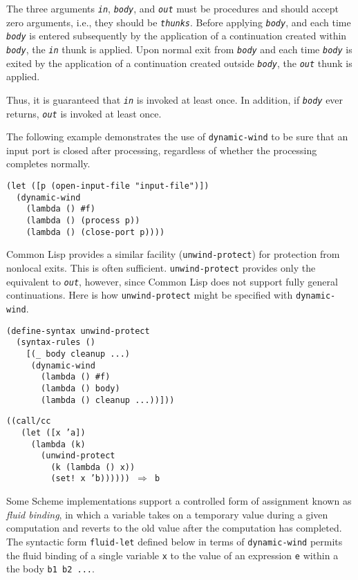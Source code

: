 The three arguments \texttt{\textit{in}}, \texttt{\textit{body}}, and \texttt{\textit{out}} must be procedures
and should accept zero arguments, i.e., they should be \label{control_s58}\texttt{\textit{thunks}}.
Before applying \texttt{\textit{body}}, and each time \texttt{\textit{body}} is entered subsequently
by the application of a continuation created within \texttt{\textit{body}}, the \texttt{\textit{in}}
thunk is applied.
Upon normal exit from \texttt{\textit{body}} and each time \texttt{\textit{body}} is exited by
the application of a continuation created outside \texttt{\textit{body}}, the \texttt{\textit{out}}
thunk is applied.


Thus, it is guaranteed that \texttt{\textit{in}} is invoked at least once.
In addition, if \texttt{\textit{body}} ever returns, \texttt{\textit{out}} is invoked at least
once.


The following example demonstrates the use of \texttt{dynamic-wind} to be sure
that an input port is closed after processing, regardless of whether the
processing completes normally.


\begin{alltt}
(let ([p (open-input-file "input-file")])
  (dynamic-wind
    (lambda () \#{}f)
    (lambda () (process p))
    (lambda () (close-port p))))
\end{alltt}


\label{control_s59}Common Lisp provides a similar
facility (\texttt{unwind-protect}) for protection from \label{control_s60}nonlocal exits.
This is often sufficient.
\texttt{unwind-protect} provides only the equivalent to \texttt{\textit{out}}, however,
since Common Lisp does not support fully general continuations.
Here is how \texttt{unwind-protect} might be specified with \texttt{dynamic-wind}.


\begin{alltt}
(define-syntax unwind-protect
  (syntax-rules ()
    [(\_{} body cleanup ...)
     (dynamic-wind
       (lambda () \#{}f)
       (lambda () body)
       (lambda () cleanup ...))]))

((call/cc
   (let ([x 'a])
     (lambda (k)
       (unwind-protect
         (k (lambda () x))
         (set! x 'b)))))) \(\Rightarrow\) b
\end{alltt}


Some Scheme implementations support a controlled form of assignment
known as \label{control_s61}\textit{fluid
binding}, in which a variable takes on a
temporary value during a given computation and reverts to the old value
after the computation has completed.
The syntactic form \texttt{fluid-let} defined below in terms of \texttt{dynamic-wind}
permits the fluid binding of a single variable \texttt{x} to the value of
an expression \texttt{e} within a the body \texttt{b1 b2 ...}.


